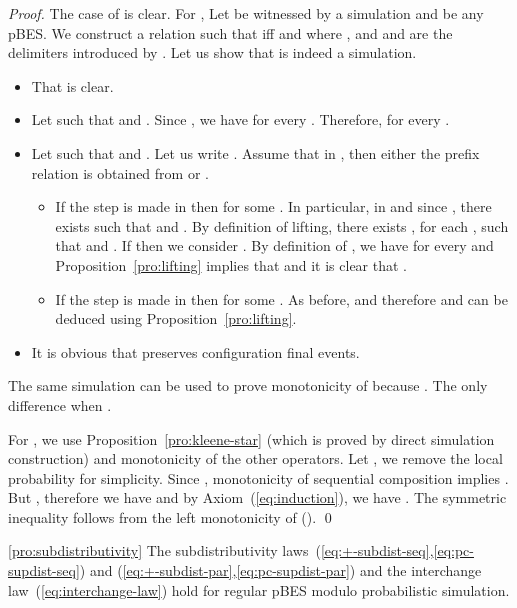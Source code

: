 \documentclass{llncs}
\newcommand{\<}{\langle}
\renewcommand{\>}{\rangle}
\begin{document}
\begin{proof}
The case of  is clear. For , Let  be witnessed by a simulation  and  be any pBES. We construct a relation  such that  iff  and  where ,  and  and  are the delimiters introduced by . Let us show that  is indeed a simulation.

\begin{itemize}
\item That  is clear.
\item Let  such that  and . Since , we have  for every . Therefore,  for every .
\item Let  such that  and . Let us write . Assume that  in , then either the prefix relation is obtained from  or .
\begin{itemize}
\item If the step is made in  then 
 for some . In particular,  in  and since , there exists  such that  and . By definition of lifting, there exists , for each , such that  and . If  then we consider . By definition of , we have  for every  and Proposition~\ref{pro:lifting} implies that  and it is clear that .

\item If the step is made in  then  for some . As before, 
 and therefore  and  can be deduced using Proposition~\ref{pro:lifting}.
\end{itemize}
\item It is obvious that  preserves configuration final events.
\end{itemize}
The same simulation  can be used to prove monotonicity of  because . The only difference when .

For , we use Proposition~\ref{pro:kleene-star} (which is proved by direct simulation construction) and monotonicity of the other operators. Let , we remove the local probability for simplicity. Since , monotonicity of sequential composition implies . But , therefore we have  and by Axiom~(\ref{eq:induction}), we have .  The symmetric inequality follows from the left monotonicity of (). \qed
\end{proof}

\begin{repproposition}{\ref{pro:subdistributivity}}
The subdistributivity laws~(\ref{eq:+-subdist-seq},\ref{eq:pc-supdist-seq}) and (\ref{eq:+-subdist-par},\ref{eq:pc-supdist-par}) and the interchange law~(\ref{eq:interchange-law}) hold for regular pBES modulo probabilistic simulation.
\end{repproposition}
\end{document}
